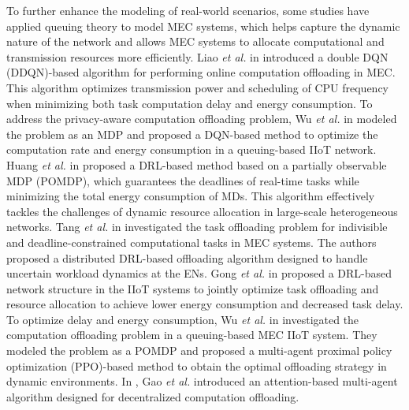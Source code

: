 \documentclass[10pt, journal,letterpaper]{IEEEtran}
\begin{document}
To further enhance the modeling of real-world scenarios, some studies have applied queuing theory to model MEC systems, which helps capture the dynamic nature of the network and allows MEC systems to allocate computational and transmission resources more efficiently.
 Liao \textit{et al.} in \cite{liao2023online} introduced a double DQN (DDQN)-based algorithm for performing online computation offloading in MEC. This algorithm optimizes transmission power and scheduling of CPU frequency when minimizing both task computation delay and energy consumption. 
To address the privacy-aware computation offloading problem, Wu \textit{et al.} in \cite{wu2024combining} modeled the problem as an MDP and proposed a DQN-based method to optimize the computation rate and energy consumption in a queuing-based IIoT network.
Huang \textit{et al.} in \cite{huang2021deadline} proposed a DRL-based method based on a partially observable MDP (POMDP), which guarantees the deadlines of real-time tasks while minimizing the total energy consumption of MDs. This algorithm effectively tackles the challenges of dynamic resource allocation in large-scale heterogeneous networks. 
Tang \textit{et al.} in \cite{9253665} investigated the task offloading problem for indivisible and deadline-constrained computational tasks in MEC systems. The authors proposed a distributed DRL-based offloading algorithm designed to handle uncertain workload dynamics at the ENs. 
 Gong \textit{et al.} in \cite{gong2022edge} proposed a DRL-based network structure in the IIoT systems to jointly optimize task offloading and resource allocation to achieve lower energy consumption and decreased task delay.
 To optimize delay and energy consumption, Wu \textit{et al.} in \cite{wu2023multi} investigated the computation offloading problem in a queuing-based MEC IIoT system. They modeled the problem as a POMDP and proposed a multi-agent proximal policy optimization (PPO)-based method to obtain the optimal offloading strategy in dynamic environments.
 In \cite{gao2022large}, Gao \textit{et al.} introduced an attention-based multi-agent algorithm designed for decentralized computation offloading.
\end{document}

